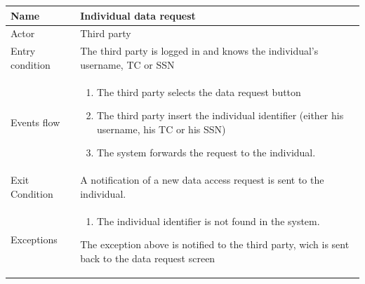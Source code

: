 \begin{tabular}{|l|p{11cm}|}
    \hline
    Name & Individual data request
    \\ \hline
    Actor & Third party
    \\ \hline 
    Entry condition & The third party is logged in and knows the individual's username, TC or SSN
        \\ \hline
    Events flow &
    \begin{enumerate}
    \item The third party selects the data request button
	\item The third party insert the individual identifier (either his username, his TC or his SSN)
	\item The system forwards the request to the individual.
    \end{enumerate}
     \\ \hline
     Exit Condition & A notification of a new data access request is sent to the individual.
     \\
    \hline
    Exceptions &
        \begin{enumerate}
    \item The individual identifier is not found in the system.
    \end{enumerate}
     The exception above is notified to the third party, wich is sent back to the data request screen
        \\  \hline

\end{tabular}



